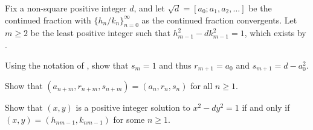 \documentclass[../notes.tex]{subfiles}
\begin{document}
\begin{prob}[7 points]
	Fix a non-square positive integer $d$, and let $\sqrt d=[a_0;a_1,a_2,\ldots]$ be the continued fraction with $\{h_n/k_n\}_{n=0}^\infty$ as the continued fraction convergents. Let $m\ge2$ be the least positive integer such that $h_{m-1}^2-dk_{m-1}^2=1$, which exists by .
	\begin{listalph}
		\item Using the notation of , show that $s_m=1$ and thus $r_{m+1}=a_0$ and $s_{m+1}=d-a_0^2$.
		\item Show that $(a_{n+m},r_{n+m},s_{n+m})=(a_n,r_n,s_n)$ for all $n\ge1$.
		\item Show that $(x,y)$ is a positive integer solution to $x^2-dy^2=1$ if and only if $(x,y)=(h_{nm-1},k_{nm-1})$ for some $n\ge1$.
	\end{listalph}
\end{prob}
\end{document}
